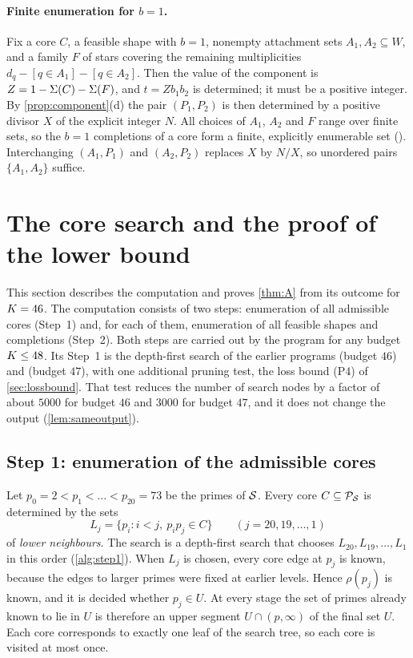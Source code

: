 \documentclass[11pt]{article}
\begin{document}
\paragraph{Finite enumeration for $b=1$.}
Fix a core $C$, a feasible shape with $b=1$, nonempty attachment sets $A_1,A_2\subseteq W$, and a family $F$ of stars covering the remaining multiplicities $d_q-[q\in A_1]-[q\in A_2]$.
Then the value of the component is $Z=1-\Sigma(C)-\Sigma(F)$, and $t=Zb_1b_2$ is determined; it must be a positive integer.
By \cref{prop:component}(d) the pair $(P_1,P_2)$ is then determined by a positive divisor $X$ of the explicit integer $N$.
All choices of $A_1$, $A_2$ and $F$ range over finite sets, so the $b=1$ completions of a core form a finite, explicitly enumerable set ().
Interchanging $(A_1,P_1)$ and $(A_2,P_2)$ replaces $X$ by $N/X$, so unordered pairs $\{A_1,A_2\}$ suffice.

\section{The core search and the proof of the lower bound}\label{sec:proof46}

This section describes the computation and proves \cref{thm:A} from its outcome for $K=46$.
The computation consists of two steps: enumeration of all admissible cores (Step~1) and, for each of them, enumeration of all feasible shapes and completions (Step~2).
Both steps are carried out by the program  for any budget $K\le48$.
Its Step~1 is the depth-first search of the earlier programs  (budget $46$) and  (budget $47$), with one additional pruning test, the loss bound (P4) of \cref{sec:lossbound}. That test reduces the number of search nodes by a factor of about $5000$ for budget $46$ and $3000$ for budget $47$, and it does not change the output (\cref{lem:sameoutput}).

\subsection{Step 1: enumeration of the admissible cores}\label{sec:step1}

Let $p_0=2<p_1<\dots<p_{20}=73$ be the primes of $\mathcal{S}$.
Every core $C\subseteq\mathcal{P}_{\mathcal{S}}$ is determined by the sets
\[
L_j=\{p_i: i<j,\ p_ip_j\in C\}\qquad(j=20,19,\dots,1)
\]
of \emph{lower neighbours}. The search is a depth-first search that chooses $L_{20},L_{19},\dots,L_1$ in this order (\cref{alg:step1}).
When $L_j$ is chosen, every core edge at $p_j$ is known, because the edges to larger primes were fixed at earlier levels. Hence $\rho(p_j)$ is known, and it is decided whether $p_j\in U$.
At every stage the set of primes already known to lie in $U$ is therefore an upper segment $U\cap(p,\infty)$ of the final set $U$.
Each core corresponds to exactly one leaf of the search tree, so each core is visited at most once.
\end{document}

